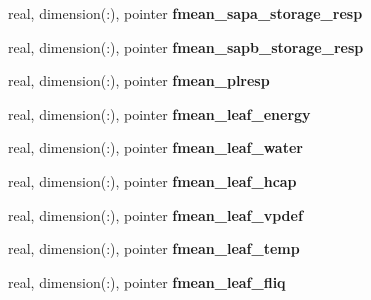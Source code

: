 \begin{DoxyCompactItemize}
\item 
\hypertarget{structed__state__vars_1_1edtype_aecf4bfaaafa6a068d1f8a00539e92e21}{
real, dimension(:), pointer {\bfseries fmean\_\-sapa\_\-storage\_\-resp}}
\label{structed__state__vars_1_1edtype_aecf4bfaaafa6a068d1f8a00539e92e21}

\item 
\hypertarget{structed__state__vars_1_1edtype_abf400855a6eeaa999ad6b0b5060a7876}{
real, dimension(:), pointer {\bfseries fmean\_\-sapb\_\-storage\_\-resp}}
\label{structed__state__vars_1_1edtype_abf400855a6eeaa999ad6b0b5060a7876}

\item 
\hypertarget{structed__state__vars_1_1edtype_a4290a8962f6a8d2fb085a9a24591a3a3}{
real, dimension(:), pointer {\bfseries fmean\_\-plresp}}
\label{structed__state__vars_1_1edtype_a4290a8962f6a8d2fb085a9a24591a3a3}

\item 
\hypertarget{structed__state__vars_1_1edtype_adb72e5bc264da7bcd5c25290ae7fe541}{
real, dimension(:), pointer {\bfseries fmean\_\-leaf\_\-energy}}
\label{structed__state__vars_1_1edtype_adb72e5bc264da7bcd5c25290ae7fe541}

\item 
\hypertarget{structed__state__vars_1_1edtype_a67d466bd020971a65b48739e6a48e6ec}{
real, dimension(:), pointer {\bfseries fmean\_\-leaf\_\-water}}
\label{structed__state__vars_1_1edtype_a67d466bd020971a65b48739e6a48e6ec}

\item 
\hypertarget{structed__state__vars_1_1edtype_a3c6920a3c015d3ab2c9ec26f1ba1f1da}{
real, dimension(:), pointer {\bfseries fmean\_\-leaf\_\-hcap}}
\label{structed__state__vars_1_1edtype_a3c6920a3c015d3ab2c9ec26f1ba1f1da}

\item 
\hypertarget{structed__state__vars_1_1edtype_ac87185e44bc6bcab520f50b885cda455}{
real, dimension(:), pointer {\bfseries fmean\_\-leaf\_\-vpdef}}
\label{structed__state__vars_1_1edtype_ac87185e44bc6bcab520f50b885cda455}

\item 
\hypertarget{structed__state__vars_1_1edtype_ac560778fc06b6e25ea666f5499c185c1}{
real, dimension(:), pointer {\bfseries fmean\_\-leaf\_\-temp}}
\label{structed__state__vars_1_1edtype_ac560778fc06b6e25ea666f5499c185c1}

\item 
\hypertarget{structed__state__vars_1_1edtype_a5f687c3f605f02faf636bc1ce92b3de7}{
real, dimension(:), pointer {\bfseries fmean\_\-leaf\_\-fliq}}
\label{structed__state__vars_1_1edtype_a5f687c3f605f02faf636bc1ce92b3de7}


\end{DoxyCompactItemize}
